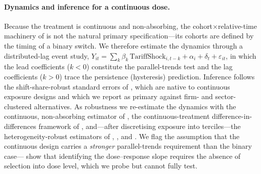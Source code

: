 \paragraph{Dynamics and inference for a continuous dose.}
Because the treatment is continuous and non-absorbing, the cohort$\times$relative-time
machinery of \citet{sunabraham2021} is not the natural primary specification---its
cohorts are defined by the timing of a binary switch. We therefore estimate the
dynamics through a distributed-lag event study, $Y_{it}=\sum_k \beta_k\,
\text{TariffShock}_{i,t-k}+\alpha_i+\delta_t+\varepsilon_{it}$, in which the lead
coefficients ($k<0$) constitute the parallel-trends test and the lag coefficients
($k>0$) trace the persistence (hysteresis) prediction. Inference follows the
shift-share-robust standard errors of \citet{adao2019}, which are native to continuous
exposure designs and which we report as primary against firm- and sector-clustered
alternatives. As robustness we re-estimate the dynamics with the continuous,
non-absorbing estimator of \citet{dechaisemartin2020}, the continuous-treatment
difference-in-differences framework of \citet{callawaygoodmanbacon2024}, and---after
discretising exposure into terciles---the heterogeneity-robust estimators of
\citet{sunabraham2021}, \citet{callawaysantanna2021}, and \citet{borusyak2024}. We
flag the assumption that the continuous design carries a \emph{stronger} parallel-trends
requirement than the binary case---\citet{callawaygoodmanbacon2024} show that
identifying the dose--response slope requires the absence of selection into dose level,
which we probe but cannot fully test.

